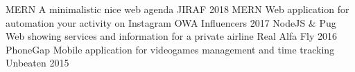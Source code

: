 \begin{cvhonors}
  \cvhonor
    {MERN}
    {A minimalistic nice web agenda}
    {JIRAF}
    {2018}
  \cvhonor
    {MERN}
    {Web application for automation your activity on Instagram}
    {OWA Influencers}
    {2017}
  \cvhonor
    {NodeJS \& Pug}
    {Web showing services and information for a private airline}
    {Real Alfa Fly}
    {2016}
  \cvhonor
    {PhoneGap}
    {Mobile application for videogames management and time tracking}
    {Unbeaten}
    {2015}
\end{cvhonors}